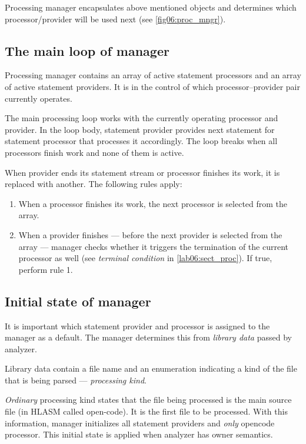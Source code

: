Processing manager encapsulates above mentioned objects and determines which processor/provider will be used next (see \cref{fig06:proc_mngr}).


\subsection{The main loop of manager}
\label{lab06:mngr_loop}

Processing manager contains an array of active statement processors and an array of active statement providers. It is in the control of which processor--provider pair currently operates.

The main processing loop works with the currently operating processor and provider. In the loop body, statement provider provides next statement for statement processor that processes it accordingly. The loop breaks when all processors finish work and none of them is active.

When provider ends its statement stream or processor finishes its work, it is replaced with another. The following rules apply:

\begin{enumerate}
	\item When a processor finishes its work, the next processor is selected from the array.
	\item When a provider finishes --- before the next provider is selected from the array --- manager checks whether it triggers the termination of the current processor as well (see \emph{terminal condition} in \cref{lab06:sect_proc}). If true, perform rule 1.
\end{enumerate}

\subsection{Initial state of manager}
\label{lab06:lib_data}

It is important which statement provider and processor is assigned to the manager as a default. The manager determines this from \emph{library data} passed by analyzer.

Library data contain a file name and an enumeration indicating a kind of the file that is being parsed --- \emph{processing kind}.

\emph{Ordinary} processing kind states that the file being processed is the main source file (in HLASM called open-code). It is the first file to be processed. With this information, manager initializes all statement providers and \emph{only} opencode processor. This initial state is applied when analyzer has owner semantics.


